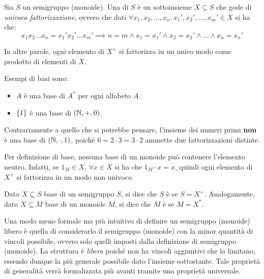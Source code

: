 \begin{definition}
  Sia \(S\) un semigruppo (monoide).
  Una  di \(S\) è un sottoinsieme \(X \subseteq S\) che gode di \emph{univoca fattorizzazione}, ovvero che dati \(\forall x_1,x_2,\ldots,x_n,x_1',x_2',\ldots,x_m' \in X\) si ha che:
  \[x_1 x_2 \ldots x_n = x_1' x_2' \ldots x_m' \implies n=m \land x_1 = x_1' \land x_2 = x_2' \land \ldots \land x_n = x_n'\]
\end{definition}
In altre parole, ogni elemento di \(X^{+}\) si fattorizza in un unico modo come prodotto di elementi di \(X\).

\begin{example}
  Esempi di basi sono:
  \begin{itemize}
    \item \(A\) è una base di \(A^*\) per ogni alfabeto \(A\).
    \item \(\set{1}\) è una base di \((\mathbb{N}, +, 0)\).
  \end{itemize}
  Contrariamente a quello che si potrebbe pensare, l'insieme dei numeri primi \textbf{non} è una base di \((\mathbb{N}, \cdot, 1)\), poiché \(6 = 2 \cdot 3 = 3 \cdot 2\) ammette due fattorizzazioni distinte.
\end{example}

\begin{note}\label{note:no_neutral_in_base}
  Per definizione di base, nessuna base di un monoide può contenere l'elemento neutro.
  Infatti, se \(1_M \in X\), \(\forall x \in X\) si ha che \(1_M \cdot x = x\), quindi ogni elemento di \(X^{+}\) si fattorizza in un modo non univoco.
\end{note}

\begin{definition}
  Data \(X \subseteq S\) base di un semigruppo \(S\), si dice che \(S\) è  se \(S = X^{+}\).
  Analogamente, dato \(X \subseteq M\) base di un monoide \(M\), si dice che \(M\) è  se \(M = X^{*}\).
\end{definition}
Una modo meno formale ma più intuitivo di definire un semigruppo (monoide) libero è quella di considerarlo il semigruppo (monoide) con la minor quantità di vincoli possibile, ovvero solo quelli imposti dalla definizione di semigruppo (monoide).
La struttura è \emph{libera} poiché non ha vincoli aggiuntivi che la limitano, essendo dunque la più generale possibile dato l'insieme sottostante.
Tale proprietà di generalità verrà formalizzata più avanti tramite una proprietà universale.

